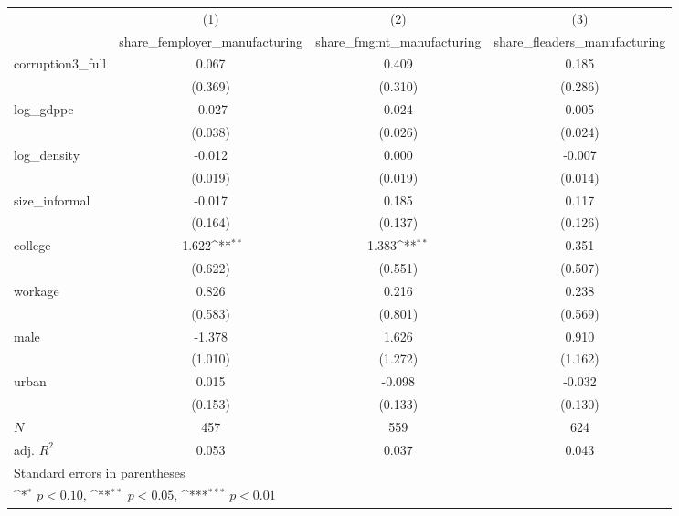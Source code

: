 {
\def\sym#1{\ifmmode^{#1}\else\(^{#1}\)\fi}
\begin{tabular}{l*{3}{c}}
\hline\hline
            &\multicolumn{1}{c}{(1)}&\multicolumn{1}{c}{(2)}&\multicolumn{1}{c}{(3)}\\
            &\multicolumn{1}{c}{share\_femployer\_manufacturing}&\multicolumn{1}{c}{share\_fmgmt\_manufacturing}&\multicolumn{1}{c}{share\_fleaders\_manufacturing}\\
\hline
corruption3\_full&       0.067         &       0.409         &       0.185         \\
            &     (0.369)         &     (0.310)         &     (0.286)         \\
[1em]
log\_gdppc   &      -0.027         &       0.024         &       0.005         \\
            &     (0.038)         &     (0.026)         &     (0.024)         \\
[1em]
log\_density &      -0.012         &       0.000         &      -0.007         \\
            &     (0.019)         &     (0.019)         &     (0.014)         \\
[1em]
size\_informal&      -0.017         &       0.185         &       0.117         \\
            &     (0.164)         &     (0.137)         &     (0.126)         \\
[1em]
college     &      -1.622\sym{**} &       1.383\sym{**} &       0.351         \\
            &     (0.622)         &     (0.551)         &     (0.507)         \\
[1em]
workage     &       0.826         &       0.216         &       0.238         \\
            &     (0.583)         &     (0.801)         &     (0.569)         \\
[1em]
male        &      -1.378         &       1.626         &       0.910         \\
            &     (1.010)         &     (1.272)         &     (1.162)         \\
[1em]
urban       &       0.015         &      -0.098         &      -0.032         \\
            &     (0.153)         &     (0.133)         &     (0.130)         \\
\hline
\(N\)       &         457         &         559         &         624         \\
adj. \(R^{2}\)&       0.053         &       0.037         &       0.043         \\
\hline\hline
\multicolumn{4}{l}{\footnotesize Standard errors in parentheses}\\
\multicolumn{4}{l}{\footnotesize \sym{*} \(p<0.10\), \sym{**} \(p<0.05\), \sym{***} \(p<0.01\)}\\
\end{tabular}
}
